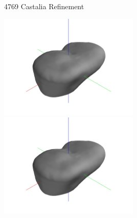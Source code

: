 \begin{frame}{4769 Castalia Refinement}

\begin{center}
    \href{https://youtu.be/pS8vLuRZGxE}{\includegraphics[trim={20cm 10cm 20cm 10cm},clip,keepaspectratio,width=0.5\textwidth,height=\textheight]{figures/dynamic_exploration/castalia/partial_14998.jpg}}%
    \href{https://youtu.be/5ETsFOXQeOs}{\includegraphics[trim={20cm 10cm 20cm 10cm},clip,keepaspectratio,width=0.5\textwidth,height=\textheight]{figures/dynamic_exploration/castalia/partial_14998.jpg}}
\end{center}

\end{frame}

